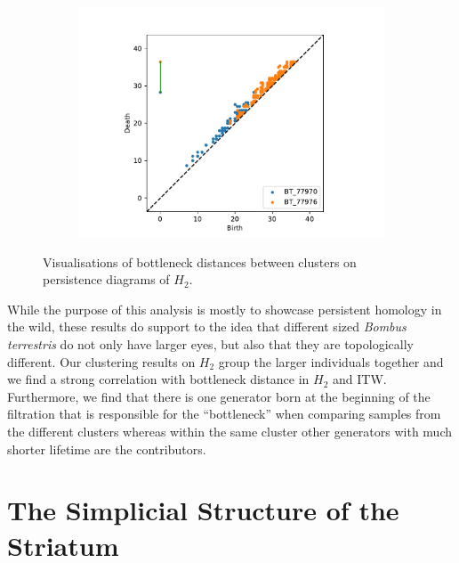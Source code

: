 \begin{figure}[ht]
\begin{subfigure}{.49 \linewidth}
  \includegraphics[scale=0.5]{matchings/77970-77976.pdf}
  \end{subfigure}
  \caption{\label{outgroup-matching} Visualisations of bottleneck distances between clusters on persistence diagrams of $H_{2}$.}
\end{figure}




While the purpose of this analysis is mostly to showcase persistent homology in the wild, these results  do support to the idea that different sized \textit{Bombus terrestris} do not only have larger eyes, but also that they are topologically different. Our clustering results on $H_{2}$ group the larger individuals together and we find a strong correlation with bottleneck distance in $H_{2}$ and ITW. Furthermore, we find that there is one generator born at the beginning of the filtration that is responsible for the ``bottleneck'' when comparing samples from the different clusters whereas within the same cluster other generators with much shorter lifetime are the contributors.
\clearpage
\section{The Simplicial Structure of the Striatum}

